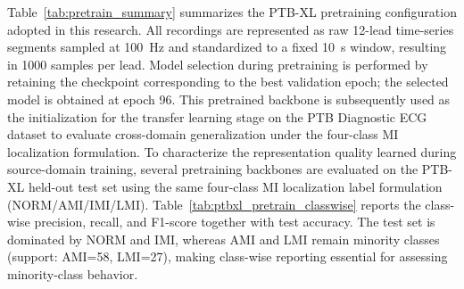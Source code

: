 \documentclass[preprint,12pt]{elsarticle}
\begin{document}
Table~\ref{tab:pretrain_summary} summarizes the PTB-XL pretraining configuration adopted in this research. All recordings are represented as raw 12-lead time-series segments sampled at 100~Hz and standardized to a fixed 10~s window, resulting in 1000 samples per lead. Model selection during pretraining is performed by retaining the checkpoint corresponding to the best validation epoch; the selected model is obtained at epoch 96. This pretrained backbone is subsequently used as the initialization for the transfer learning stage on the PTB Diagnostic ECG dataset to evaluate cross-domain generalization under the four-class MI localization formulation. To characterize the representation quality learned during source-domain training, several pretraining backbones are evaluated on the PTB-XL held-out test set using the same four-class MI localization label formulation (NORM/AMI/IMI/LMI). Table~\ref{tab:ptbxl_pretrain_classwise} reports the class-wise precision, recall, and F1-score together with test accuracy. The test set is dominated by NORM and IMI, whereas AMI and LMI remain minority classes (support: AMI=58, LMI=27), making class-wise reporting essential for assessing minority-class behavior.
\end{document}
